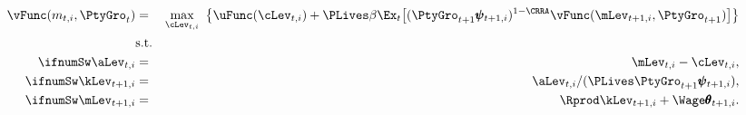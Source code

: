 \begin{eqnarray}
    \vFunc({m}_{t,i},\PtyGro_t) & = & \max_{\cLev_{t,i}} ~ \big\{ \uFunc(\cLev_{t,i}) + \PLives \beta
    \Ex_{t}\big[ (\PtyGro_{t+1} \pmb{\psi}_{t+1,i})^{1-\CRRA}\vFunc(\mLev_{t+1,i},\PtyGro_{t+1})\big] \big\}
    \label{eq:scaledv}
\\  & \mbox{s.t.} & \nonumber
\\ \ifnumSw  \aLev_{t,i}   & = & \mLev_{t,i} - \cLev_{t,i}, \nonumber
\\ \ifnumSw  \kLev_{t+1,i} & = & \aLev_{t,i} /( \PLives \PtyGro_{t+1} \pmb{\psi}_{t+1,i} ),  \nonumber
\\ \ifnumSw  \mLev_{t+1,i} & = & \Rprod \kLev_{t+1,i} + \Wage \pmb{\theta}_{t+1,i}.  \nonumber
\end{eqnarray}

